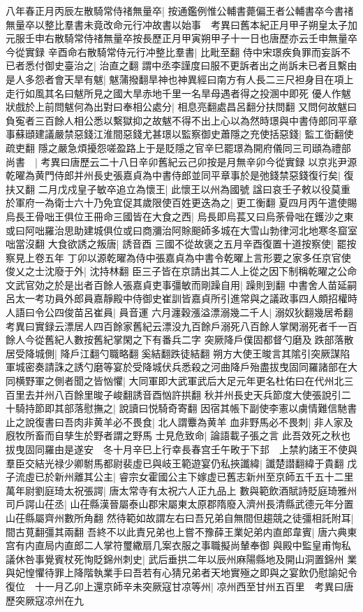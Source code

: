 八年春正月丙辰左散騎常侍禇無量卒|{
	按通鑑例惟公輔書薨偏王者公輔書卒今書禇無量卒以整比羣書未竟改命元行冲故書以始事　考異曰舊本紀正月甲子朔皇太子加元服壬申右散騎常侍禇無量卒按長歷正月甲寅朔甲子十一日也唐歷亦云壬申無量卒今從實録}
辛酉命右散騎常侍元行冲整比羣書|{
	比毗至翻}
侍中宋璟疾負罪而妄訴不已者悉付御史臺治之|{
	治直之翻}
謂中丞李謹度曰服不更訴者出之尚訴未已者且繫由是人多怨者會天旱有魃|{
	魃蒲撥翻旱神也神異經曰南方有人長二三尺袒身目在項上走行如風其名曰魃所見之國大旱赤地千里一名旱母遇者得之投溷中即死}
優人作魃狀戲於上前問魃何為出對曰奉相公處分|{
	相息亮翻處昌呂翻分扶問翻}
又問何故魃曰負寃者三百餘人相公悉以繫獄抑之故魃不得不出上心以為然時璟與中書侍郎同平章事蘇頲建議嚴禁惡錢江淮間惡錢尤甚璟以監察御史蕭隱之充使括惡錢|{
	監工衘翻使疏吏翻}
隱之嚴急煩擾怨嗟盈路上于是貶隱之官辛巳罷璟為開府儀同三司頲為禮部尚書　|{
	考異曰唐歷云二十八日辛卯舊紀云己卯按是月無辛卯今從實録}
以京兆尹源乾曜為黄門侍郎并州長史張嘉貞為中書侍郎並同平章事於是弛錢禁惡錢復行矣|{
	復扶又翻}
二月戊戍皇子敏卒追立為懷王|{
	此懷王以州為國號}
諡曰哀壬子敕以役莫重於軍府一為衛士六十乃免宜促其歲限使百姓更迭為之|{
	更工衡翻}
夏四月丙午遣使賜烏長王骨咄王俱位王冊命三國皆在大食之西|{
	烏長即烏萇又曰烏荼骨咄在鑊沙之東或曰阿咄羅治思助建城俱位或曰商瀰治阿賖䫻師多城在大雪山勃律河北地寒冬窟室咄當沒翻}
大食欲誘之叛唐|{
	誘音酉}
三國不從故褒之五月辛酉復置十道按察使|{
	罷按察見上卷五年}
丁卯以源乾曜為侍中張嘉貞為中書令乾曜上言形要之家多任京官使俊乂之士沈廢于外|{
	沈持林翻}
臣三子皆在京請出其二人上從之因下制稱乾曜之公命文武官効之於是出者百餘人張嘉貞吏事彊敏而剛躁自用|{
	躁則到翻}
中書舍人苗延嗣呂太一考功員外郎員嘉靜殿中侍御史崔訓皆嘉貞所引進常與之議政事四人頗招權時人語曰令公四俊苗呂崔員|{
	員音運}
六月瀍穀漲溢漂溺幾二千人|{
	溺奴狄翻幾居希翻　考異曰實録云漂居人四百餘家舊紀云漂没九百餘戶溺死八百餘人掌閑溺死者千一百餘人今從舊紀人數按舊紀掌閑之下有番兵二字}
突厥降戶僕固都督勺磨及跌部落散居受降城側|{
	降戶江翻勺職略翻奚結翻跌徒結翻}
朔方大使王晙言其隂引突厥謀陷軍城密奏請誅之誘勺磨等宴於受降城伏兵悉殺之河曲降戶殆盡拔曳固同羅諸部在大同横野軍之側者聞之皆忷懼|{
	大同軍即大武軍武后大足元年更名杜佑曰在代州北三百里去并州八百餘里晙子峻翻誘音酉忷許拱翻}
秋并州長史天兵節度大使張說引二十騎持節即其部落慰撫之|{
	說讀曰悦騎奇寄翻}
因宿其帳下副使李憲以虜情難信馳書止之說復書曰吾肉非黄羊必不畏食|{
	北人謂麞為黄羊}
血非野馬必不畏刺|{
	非人家及廐牧所畜而自孳生於野者謂之野馬}
士見危致命|{
	論語載子張之言}
此吾效死之秋也拔曳固同羅由是遂安　冬十月辛巳上行幸長春宫壬午畋于下邽　上禁約諸王不使與羣臣交結光禄少卿駙馬都尉裴虛已與岐王範遊宴仍私挾讖緯|{
	讖楚譛翻緯于貴翻}
戊子流虛已於新州離其公主|{
	睿宗女霍國公主下嫁虚已舊志新州至京師五千五十二里}
萬年尉劉庭琦太祝張諤|{
	唐太常寺有太祝六人正九品上}
數與範飲酒賦詩貶庭琦雅州司戶諤山茌丞|{
	山茌縣漢晉屬泰山郡宋屬東太原郡隋廢入濟州長清縣武德元年分置山茌縣屬齊州數所角翻}
然待範如故謂左右曰吾兄弟自無間但趨競之徒彊相託附耳|{
	間古莧翻彊其兩翻}
吾終不以此責兄弟也上嘗不豫薛王業妃弟内直郎韋賓|{
	唐六典東宫有内直局内直郎二人掌符璽繖扇几案衣服之事職擬尚輦奉御}
與殿中監皇甫恂私議休咎事覺賓杖死恂貶錦州刺史|{
	武后垂拱二年以辰州麻陽縣地及開山洞置錦州}
業與妃惶懼待罪上降階執業手曰吾若有心猜兄弟者天地實殛之即與之宴飲仍慰諭妃令復位　十一月乙卯上還京師辛未突厥寇甘凉等州|{
	凉州西至甘州五百里　考異曰唐歷突厥寇凉州在九}


